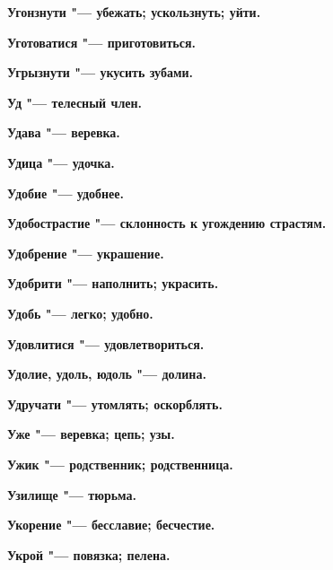 \begin{multicols}{2}
\bfseries Угонзнути\normalfont{} "--- убежать; ускользнуть; уйти. 




\bfseries Уготоватися\normalfont{} "--- приготовиться. 




\bfseries Угрызнути\normalfont{} "--- укусить зубами. 




\bfseries Уд\normalfont{} "--- телесный член. 




\bfseries Удава\normalfont{} "--- веревка. 




\bfseries Удица\normalfont{} "--- удочка. 




\bfseries Удобие\normalfont{} "--- удобнее. 




\bfseries Удобострастие\normalfont{} "--- склонность к угождению страстям. 




\bfseries Удобрение\normalfont{} "--- украшение. 




\bfseries Удобрити\normalfont{} "--- наполнить; украсить. 




\bfseries Удобь\normalfont{} "--- легко; удобно. 




\bfseries Удовлитися\normalfont{} "--- удовлетвориться. 




\bfseries Удолие, удоль, юдоль\normalfont{} "--- долина. 




\bfseries Удручати\normalfont{} "--- утомлять; оскорблять. 




\bfseries Уже\normalfont{} "--- веревка; цепь; узы. 




\bfseries Ужик\normalfont{} "--- родственник; родственница. 




\bfseries Узилище\normalfont{} "--- тюрьма. 




\bfseries Укорение\normalfont{} "--- бесславие; бесчестие. 




\bfseries Укрой\normalfont{} "--- повязка; пелена. 





\end{multicols}

